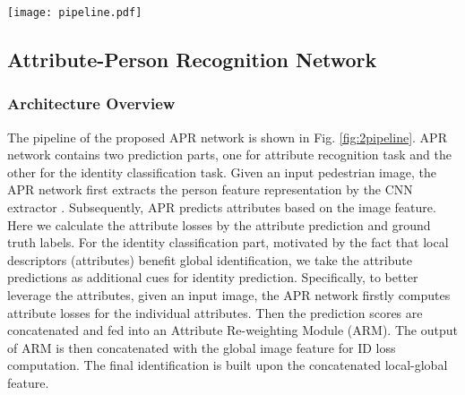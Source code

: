 \documentclass[5p,times,twocolumn]{elsarticle}
\begin{document}
\begin{figure*}[t]
        \begin{center}
            \texttt{[image: pipeline.pdf]}
        \end{center}
\caption{An overview of the APR network. APR contains two classification part, one for attribute recognition and the other for identification. 
Given an input image, the person feature representation is extracted by the CNN extractor . Subsequently, the attribute classifiers predict attributes based on the image feature. Here we calculate the attribute classification losses by the attribute predictions and ground truth labels.
For the identity classification part, we take the attribute predictions as additional cues.
Specifically, we first re-weight the local attribute predictions by the Attribute Re-weighting Module and then concatenate them with the global image feature.
The final identification is built upon the concatenated local-global feature.}
        \label{fig:2pipeline}
    \end{figure*}
    
    
    
\subsection{Attribute-Person Recognition Network}\label{sec:APR}

\subsubsection{Architecture Overview} 
The pipeline of the proposed APR network is shown in Fig. \ref{fig:2pipeline}. APR network contains two prediction parts, one for attribute recognition task and the other for the identity classification task. 
Given an input pedestrian image, the APR network first extracts the person feature representation by the CNN extractor . Subsequently, APR predicts attributes based on the image feature. Here we calculate the attribute losses by the attribute prediction and ground truth labels. 
For the identity classification part, motivated by the fact that local descriptors (attributes) benefit global identification, we take the attribute predictions as additional cues for identity prediction.
Specifically, to better leverage the attributes, given an input image, the APR network firstly computes attribute losses for the  individual attributes. Then the  prediction scores are concatenated and fed into an Attribute Re-weighting Module (ARM). The output of ARM is then concatenated with the global image feature for ID loss computation. The final identification is built upon the concatenated local-global feature.
    
\end{document}
